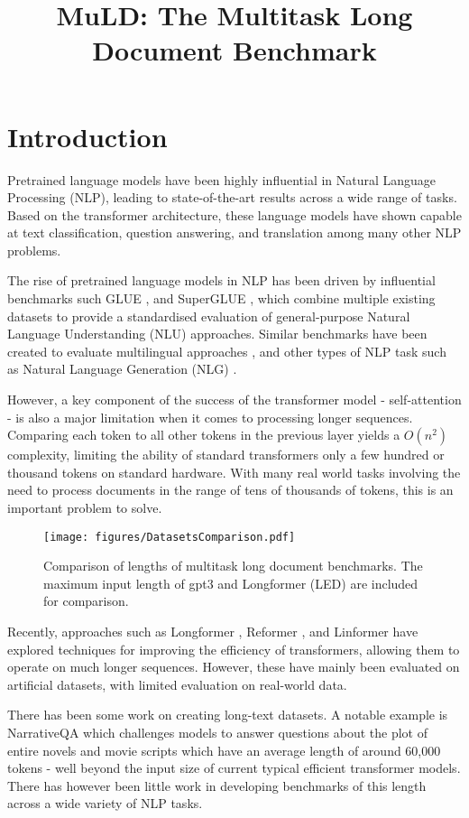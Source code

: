 \documentclass[10pt, a4paper]{article}
\title{MuLD: The Multitask Long Document Benchmark}
\begin{document}
\maketitleabstract

\section{Introduction}

Pretrained language models have been highly influential in Natural Language Processing (NLP), leading to state-of-the-art results across a wide range of tasks. Based on the transformer architecture, these language models have shown capable at text classification, question answering, and translation among many other NLP problems.

The rise of pretrained language models in NLP has been driven by influential benchmarks such GLUE \cite{Wang_2018}, and SuperGLUE \cite{Wang_2019}, which combine multiple existing datasets to provide a standardised evaluation of general-purpose Natural Language Understanding (NLU) approaches. Similar benchmarks have been created to evaluate multilingual approaches \cite{Yao_2021}, and other types of NLP task such as Natural Language Generation (NLG) \cite{Liu_2021}.

However, a key component of the success of the transformer model - self-attention - is also a major limitation when it comes to processing longer sequences. Comparing each token to all other tokens in the previous layer yields a $O(n^2)$ complexity, limiting the ability of standard transformers only a few hundred or thousand tokens on standard hardware. With many real world tasks involving the need to process documents in the range of tens of thousands of tokens, this is an important problem to solve.

\begin{figure}[t]
    \centering
    \texttt{[image: figures/DatasetsComparison.pdf]}
    \caption{\centering Comparison of lengths of multitask long document benchmarks. The maximum input length of gpt3 and Longformer (LED) are included for comparison.}
    \label{fig:benchmark_comparison}
\end{figure}
Recently, approaches such as Longformer \cite{Beltagy_2020}, Reformer \cite{Kitaev_2020}, and Linformer \cite{Wang_2020} have explored techniques for improving the efficiency of transformers, allowing them to operate on much longer sequences. However, these have mainly been evaluated on artificial datasets, with limited evaluation on real-world data.

There has been some work on creating long-text datasets. A notable example is NarrativeQA \cite{Kocisky_2018} which challenges models to answer questions about the plot of entire novels and movie scripts which have an average length of around 60,000 tokens - well beyond the input size of current typical efficient transformer models. There has however been little work in developing benchmarks of this length across a wide variety of NLP tasks.
\end{document}
